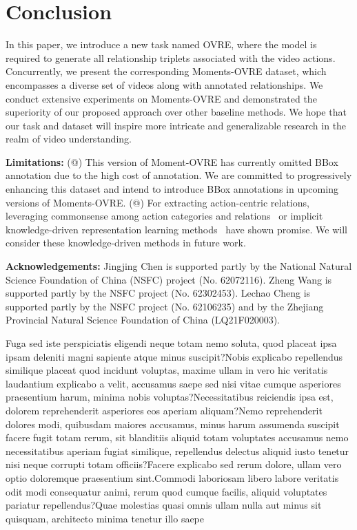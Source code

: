 \documentclass[letterpaper]{article}
\makeatletter
\newcommand{\Rmnum}[1]{\expandafter\@slowromancap\romannumeral #1@}
\makeatother
\begin{document}
\vspace{-2.08mm}
\section{Conclusion}
In this paper, we introduce a new task named OVRE, where the model is required to generate all relationship triplets associated with the video actions. Concurrently, we present the corresponding Moments-OVRE dataset, which encompasses a diverse set of videos along with annotated relationships. We conduct extensive experiments on Moments-OVRE and demonstrated the superiority of our proposed approach over other baseline methods. We hope that our task and dataset will inspire more intricate and generalizable research in the realm of video understanding.

\hspace*{\fill}

\noindent \textbf{Limitations:}
(\Rmnum{1}) This version of Moment-OVRE has currently omitted BBox annotation due to the high cost of annotation. We are committed to progressively enhancing this dataset and intend to introduce BBox annotations in upcoming versions of Moments-OVRE.
(\Rmnum{2}) For extracting action-centric relations, leveraging commonsense among action categories and relations~\cite{yang2018commonsense} or implicit knowledge-driven representation learning methods~\cite{li2023knowledge, li2018deep} have shown promise. We will consider these knowledge-driven methods in future work.

\hspace*{\fill}

\vspace{-1.82mm}
\vspace{-0.79mm}
\vspace{-2.20mm}
\noindent \textbf{Acknowledgements:} Jingjing Chen is supported partly by the National Natural Science Foundation of China (NSFC) project (No. 62072116). Zheng Wang is supported partly by the NSFC project (No. 62302453). Lechao Cheng is supported partly by the NSFC project (No. 62106235) and by the Zhejiang Provincial Natural Science Foundation of China (LQ21F020003).


Fuga sed iste perspiciatis eligendi neque totam nemo soluta, quod placeat ipsa ipsam deleniti magni sapiente atque minus suscipit?Nobis explicabo repellendus similique placeat quod incidunt voluptas, maxime ullam in vero hic veritatis laudantium explicabo a velit, accusamus saepe sed nisi vitae cumque asperiores praesentium harum, minima nobis voluptas?Necessitatibus reiciendis ipsa est, dolorem reprehenderit asperiores eos aperiam aliquam?Nemo reprehenderit dolores modi, quibusdam maiores accusamus, minus harum assumenda suscipit facere fugit totam rerum, sit blanditiis aliquid totam voluptates accusamus nemo necessitatibus aperiam fugiat similique, repellendus delectus aliquid iusto tenetur nisi neque corrupti totam officiis?Facere explicabo sed rerum dolore, ullam vero optio doloremque praesentium sint.Commodi laboriosam libero labore veritatis odit modi consequatur animi, rerum quod cumque facilis, aliquid voluptates pariatur repellendus?Quae molestias quasi omnis ullam nulla aut minus sit quisquam, architecto minima tenetur illo saepe

\end{document}
